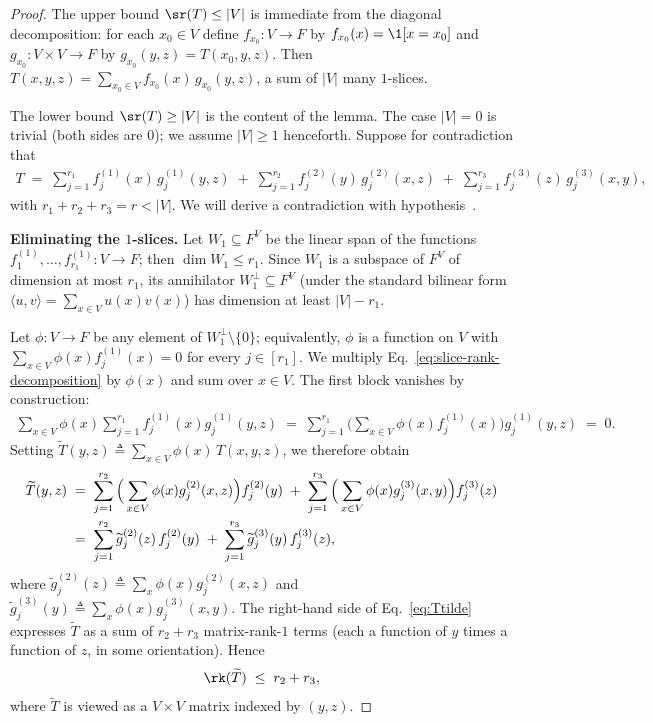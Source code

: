 \begin{proof}
The upper bound $\sr(T) \le |V|$ is immediate from the diagonal decomposition: for each $x_0 \in V$ define $f_{x_0}: V \to F$ by $f_{x_0}(x) = \1[x = x_0]$ and $g_{x_0}: V \times V \to F$ by $g_{x_0}(y, z) = T(x_0, y, z)$. Then $T(x, y, z) = \sum_{x_0 \in V} f_{x_0}(x) \, g_{x_0}(y, z)$, a sum of $|V|$ many $1$-slices.

The lower bound $\sr(T) \ge |V|$ is the content of the lemma. The case $|V| = 0$ is trivial (both sides are $0$); we assume $|V| \ge 1$ henceforth. Suppose for contradiction that
\begin{align}\label{eq:slice-rank-decomposition}
T \;=\; \sum_{j=1}^{r_1} f_j^{(1)}(x) \, g_j^{(1)}(y, z) \;+\; \sum_{j=1}^{r_2} f_j^{(2)}(y) \, g_j^{(2)}(x, z) \;+\; \sum_{j=1}^{r_3} f_j^{(3)}(z) \, g_j^{(3)}(x, y),
\end{align}
with $r_1 + r_2 + r_3 = r < |V|$. We will derive a contradiction with hypothesis~.

\textbf{Eliminating the $1$-slices.} Let $W_1 \subseteq F^V$ be the linear span of the functions $f_1^{(1)}, \dots, f_{r_1}^{(1)}: V \to F$; then $\dim W_1 \le r_1$. Since $W_1$ is a subspace of $F^V$ of dimension at most $r_1$, its annihilator $W_1^\perp \subseteq F^V$ (under the standard bilinear form $\langle u, v \rangle = \sum_{x \in V} u(x) v(x)$) has dimension at least $|V| - r_1$.

Let $\phi: V \to F$ be any element of $W_1^\perp \setminus \{0\}$; equivalently, $\phi$ is a function on $V$ with $\sum_{x \in V} \phi(x) f_j^{(1)}(x) = 0$ for every $j \in [r_1]$. We multiply Eq.~\eqref{eq:slice-rank-decomposition} by $\phi(x)$ and sum over $x \in V$. The first block vanishes by construction:
\begin{align*}
\sum_{x \in V} \phi(x) \sum_{j=1}^{r_1} f_j^{(1)}(x) g_j^{(1)}(y, z)
\;=\; \sum_{j=1}^{r_1} \Big( \sum_{x \in V} \phi(x) f_j^{(1)}(x) \Big) g_j^{(1)}(y, z)
\;=\; 0.
\end{align*}
Setting $\widetilde{T}(y, z) \triangleq \sum_{x \in V} \phi(x) \, T(x, y, z)$, we therefore obtain
\begin{align}\label{eq:Ttilde}
\widetilde{T}(y, z)
&\;=\; \sum_{j=1}^{r_2} \Big( \sum_{x \in V} \phi(x) g_j^{(2)}(x, z) \Big) f_j^{(2)}(y) \;+\; \sum_{j=1}^{r_3} \Big( \sum_{x \in V} \phi(x) g_j^{(3)}(x, y) \Big) f_j^{(3)}(z) \notag\\
&\;=\; \sum_{j=1}^{r_2} \widetilde{g}_j^{(2)}(z) \, f_j^{(2)}(y) \;+\; \sum_{j=1}^{r_3} \widetilde{g}_j^{(3)}(y) \, f_j^{(3)}(z),
\end{align}
where $\widetilde{g}_j^{(2)}(z) \triangleq \sum_x \phi(x) g_j^{(2)}(x, z)$ and $\widetilde{g}_j^{(3)}(y) \triangleq \sum_x \phi(x) g_j^{(3)}(x, y)$. The right-hand side of Eq.~\eqref{eq:Ttilde} expresses $\widetilde{T}$ as a sum of $r_2 + r_3$ matrix-rank-$1$ terms (each a function of $y$ times a function of $z$, in some orientation). Hence
\begin{align}\label{eq:rank-Ttilde}
\rk(\widetilde{T}) \;\le\; r_2 + r_3,
\end{align}
where $\widetilde{T}$ is viewed as a $V \times V$ matrix indexed by $(y, z)$.


\end{proof}
